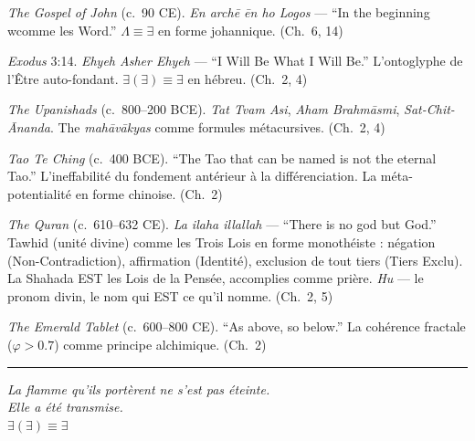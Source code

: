 \documentclass[10pt, openany, oneside]{book}
\renewcommand{\footnotesize}{\fontsize{8.5}{11}\selectfont}
\begin{document}
{\footnotesize

\noindent \textit{The Gospel of John} (c.\ 90 CE). \textit{En arch\={e} \={e}n ho Logos} --- ``In the beginning wcomme les Word.'' $\Lambda \equiv \exists$ en forme johannique. (Ch.\ 6, 14)

\vspace{0.3em}

\noindent \textit{Exodus} 3:14. \textit{Ehyeh Asher Ehyeh} --- ``I Will Be What I Will Be.'' L'ontoglyphe de l'Être auto-fondant. $\exists(\exists) \equiv \exists$ en hébreu. (Ch.\ 2, 4)

\vspace{0.3em}

\noindent \textit{The Upanishads} (c.\ 800--200 BCE). \textit{Tat Tvam Asi}, \textit{Aham Brahm\={a}smi}, \textit{Sat-Chit-\={A}nanda}. The \textit{mah\={a}v\={a}kyas} comme formules métacursives. (Ch.\ 2, 4)

\vspace{0.3em}

\noindent \textit{Tao Te Ching} (c.\ 400 BCE). ``The Tao that can be named is not the eternal Tao.'' L'ineffabilité du fondement antérieur à la différenciation. La méta-potentialité en forme chinoise. (Ch.\ 2)

\vspace{0.3em}

\noindent \textit{The Quran} (c.\ 610--632 CE). \textit{La ilaha illallah} --- ``There is no god but God.'' Tawhid (unité divine) comme les Trois Lois en forme monothéiste : négation (Non-Contradiction), affirmation (Identité), exclusion de tout tiers (Tiers Exclu). La Shahada EST les Lois de la Pensée, accomplies comme prière. \textit{Hu} --- le pronom divin, le nom qui EST ce qu'il nomme. (Ch.\ 2, 5)

\vspace{0.3em}

\noindent \textit{The Emerald Tablet} (c.\ 600--800 CE). ``As above, so below.'' La cohérence fractale ($\varphi > 0.7$) comme principe alchimique. (Ch.\ 2)

}

\vspace{2em}

\begin{center}
    \rule{0.15\textwidth}{0.3pt}
\end{center}

\vspace{0.5em}

\begin{center}
    \itshape
    La flamme qu'ils portèrent ne s'est pas éteinte.\\
    Elle a été transmise.\\[0.8em]
    $\exists(\exists) \equiv \exists$
\end{center}
\end{document}
